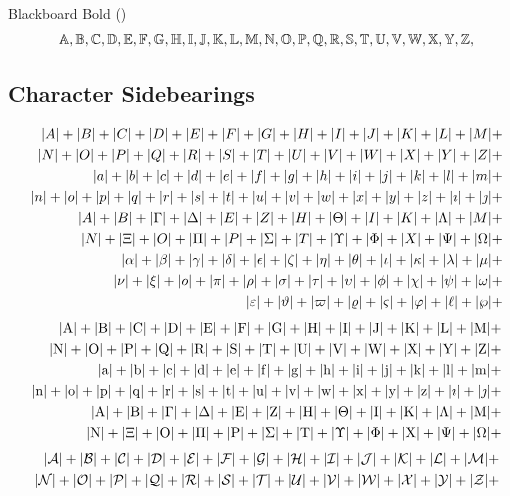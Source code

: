 \documentclass{article}
\def\test#1{#1}
\def\testupperi{%
  \test A \test B \test C \test D \test E \test F \test G \test H
  \test I \test J \test K \test L \test M }
\def\testupperii{%
  \test N \test O \test P \test Q \test R \test S \test T \test U
  \test V \test W \test X \test Y \test Z }
\def\testupper{%
  \testupperi\testupperii}
\def\testloweri{%
  \test a \test b \test c \test d \test e \test f \test g \test h
  \test i \test j \test k \test l \test m }
\def\testlowerii{%
  \test n \test o \test p \test q \test r \test s \test t \test u
  \test v \test w \test x \test y \test z 
  \test\imath \test\jmath }
\def\testupgreeki{%
  \test A \test B \test\Gamma \test\Delta \test E \test Z \test H
  \test\Theta \test I \test K \test\Lambda \test M }
\def\testupgreekii{%
  \test N \test\Xi \test O \test\Pi \test P \test\Sigma \test T
  \test\Upsilon \test\Phi \test X \test\Psi \test\Omega 
}
\def\testlowgreeki{%
  \test\alpha \test\beta \test\gamma \test\delta \test\epsilon
  \test\zeta \test\eta \test\theta \test\iota \test\kappa \test\lambda
  \test\mu }
\def\testlowgreekii{%
  \test\nu \test\xi \test o \test\pi \test\rho \test\sigma \test\tau
  \test\upsilon \test\phi \test\chi \test\psi \test\omega }
\def\testlowgreekiii{%
  \test\varepsilon \test\vartheta \test\varpi \test\varrho
  \test\varsigma \test\varphi \test\ell \test\wp}
\begin{document}
Blackboard Bold (\texttt{\string\mathbb})
\def\test#1{\mathbb{#1},}
\begin{eqnarray*}
  && {\testupper}
\end{eqnarray*}%


\clearpage
\subsection{Character Sidebearings}

\def\test#1{|#1|+}
\begin{eqnarray*}
  && {\testupperi}\\
  && {\testupperii}\\
  && {\testloweri}\\ 
  && {\testlowerii}\\ 
  && {\testupgreeki}\\
  && {\testupgreekii}\\
  && {\testlowgreeki}\\
  && {\testlowgreekii}\\
  && {\testlowgreekiii}
\end{eqnarray*}%
%
\def\test#1{|\mathrm{#1}|+}%
\begin{eqnarray*}
  && {\testupperi}\\
  && {\testupperii}\\
  && {\testloweri}\\ 
  && {\testlowerii}\\ 
  && {\testupgreeki}\\
  && {\testupgreekii}
\end{eqnarray*}%
%
%
\def\test#1{|\mathcal{#1}|+}%
\begin{eqnarray*}
  && {\testupperi}\\
  && {\testupperii}
\end{eqnarray*}%
\end{document}
